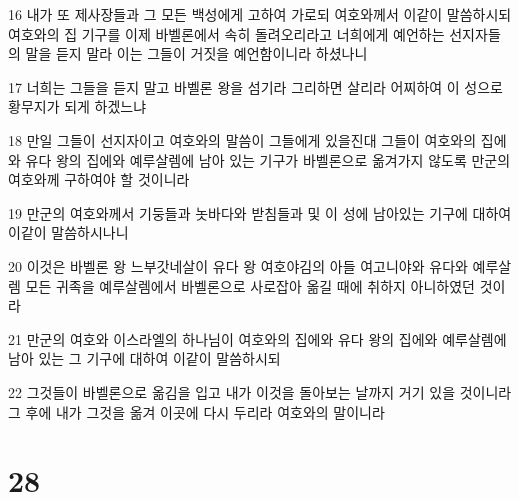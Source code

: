 \par 16 내가 또 제사장들과 그 모든 백성에게 고하여 가로되 여호와께서 이같이 말씀하시되 여호와의 집 기구를 이제 바벨론에서 속히 돌려오리라고 너희에게 예언하는 선지자들의 말을 듣지 말라 이는 그들이 거짓을 예언함이니라 하셨나니
\par 17 너희는 그들을 듣지 말고 바벨론 왕을 섬기라 그리하면 살리라 어찌하여 이 성으로 황무지가 되게 하겠느냐
\par 18 만일 그들이 선지자이고 여호와의 말씀이 그들에게 있을진대 그들이 여호와의 집에와 유다 왕의 집에와 예루살렘에 남아 있는 기구가 바벨론으로 옮겨가지 않도록 만군의 여호와께 구하여야 할 것이니라
\par 19 만군의 여호와께서 기둥들과 놋바다와 받침들과 및 이 성에 남아있는 기구에 대하여 이같이 말씀하시나니
\par 20 이것은 바벨론 왕 느부갓네살이 유다 왕 여호야김의 아들 여고니야와 유다와 예루살렘 모든 귀족을 예루살렘에서 바벨론으로 사로잡아 옮길 때에 취하지 아니하였던 것이라
\par 21 만군의 여호와 이스라엘의 하나님이 여호와의 집에와 유다 왕의 집에와 예루살렘에 남아 있는 그 기구에 대하여 이같이 말씀하시되
\par 22 그것들이 바벨론으로 옮김을 입고 내가 이것을 돌아보는 날까지 거기 있을 것이니라 그 후에 내가 그것을 옮겨 이곳에 다시 두리라 여호와의 말이니라

\chapter{28}

